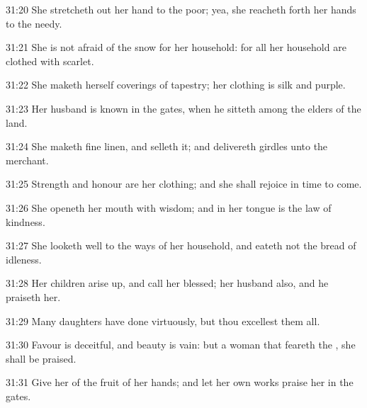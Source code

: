 31:20 She stretcheth out her hand to the poor; yea, she reacheth forth
her hands to the needy.

31:21 She is not afraid of the snow for her household: for all her
household are clothed with scarlet.

31:22 She maketh herself coverings of tapestry; her clothing is silk
and purple.

31:23 Her husband is known in the gates, when he sitteth among the
elders of the land.

31:24 She maketh fine linen, and selleth it; and delivereth girdles
unto the merchant.

31:25 Strength and honour are her clothing; and she shall rejoice in
time to come.

31:26 She openeth her mouth with wisdom; and in her tongue is the law
of kindness.

31:27 She looketh well to the ways of her household, and eateth not
the bread of idleness.

31:28 Her children arise up, and call her blessed; her husband also,
and he praiseth her.

31:29 Many daughters have done virtuously, but thou excellest them
all.

31:30 Favour is deceitful, and beauty is vain: but a woman that
feareth the \LORD, she shall be praised.

31:31 Give her of the fruit of her hands; and let her own works praise
her in the gates.

